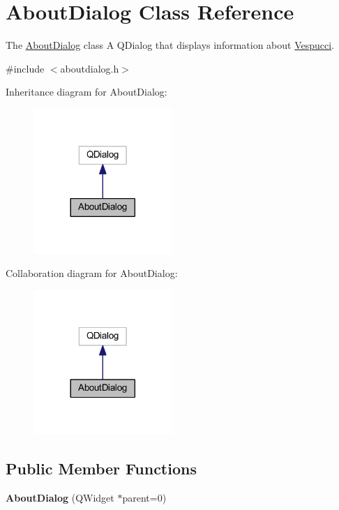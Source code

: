 \hypertarget{class_about_dialog}{\section{About\+Dialog Class Reference}
\label{class_about_dialog}
}


The \hyperlink{class_about_dialog}{About\+Dialog} class A Q\+Dialog that displays information about \hyperlink{namespace_vespucci}{Vespucci}.  




{\ttfamily \#include $<$aboutdialog.\+h$>$}



Inheritance diagram for About\+Dialog\+:\nopagebreak
\begin{figure}[H]
\begin{center}
\leavevmode
\includegraphics[width=149pt]{class_about_dialog__inherit__graph}
\end{center}
\end{figure}


Collaboration diagram for About\+Dialog\+:\nopagebreak
\begin{figure}[H]
\begin{center}
\leavevmode
\includegraphics[width=149pt]{class_about_dialog__coll__graph}
\end{center}
\end{figure}
\subsection*{Public Member Functions}
\begin{DoxyCompactItemize}
\item 
\hypertarget{class_about_dialog_ad96fc2ce8de7568ace543b7c69c71c56}{{\bfseries About\+Dialog} (Q\+Widget $\ast$parent=0)}\label{class_about_dialog_ad96fc2ce8de7568ace543b7c69c71c56}

\end{DoxyCompactItemize}


